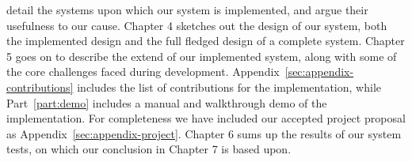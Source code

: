 detail the systems upon which our system is implemented, and argue their
usefulness to our cause. Chapter 4 sketches out the design of our system, both 
the implemented design and the full fledged design of a complete system.
Chapter 5 goes on to describe the extend of our implemented system, along with
some of the core challenges faced during development.
Appendix~\ref{sec:appendix-contributions} includes the list of contributions
for the implementation, while Part~\ref{part:demo} includes a manual and
walkthrough demo of the implementation. For completeness we have included
our accepted project proposal as Appendix~\ref{sec:appendix-project}.
Chapter 6 sums up the results of our system tests, on which our conclusion in
Chapter 7 is based upon.

